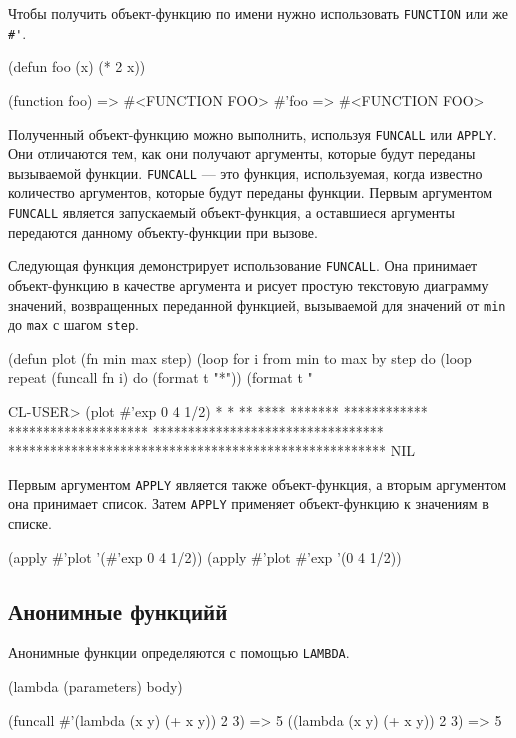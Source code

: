 Чтобы получить объект-функцию по имени нужно использовать \lstinline{FUNCTION} или же \lstinline{#'}.
\begin{cllst}{}{}
(defun foo (x) (* 2 x))

(function foo) => #<FUNCTION FOO>
#'foo          => #<FUNCTION FOO>
\end{cllst}

Полученный объект-функцию можно выполнить, используя \lstinline{FUNCALL} или \lstinline{APPLY}. Они отличаются тем, как они получают аргументы, которые будут переданы вызываемой функции. \lstinline{FUNCALL} — это функция, используемая, когда известно количество аргументов, которые будут переданы функции. Первым аргументом \lstinline{FUNCALL} является запускаемый объект-функция, а оставшиеся аргументы передаются данному объекту-функции при вызове.

Следующая функция демонстрирует использование \lstinline{FUNCALL}. Она принимает объект-функцию в качестве аргумента и рисует простую текстовую диаграмму значений, возвращенных переданной функцией, вызываемой для значений от \lstinline{min} до \lstinline{max} с шагом \lstinline{step}.
\begin{cllst}{}{}
(defun plot (fn min max step)
  (loop for i from min to max by step do
        (loop repeat (funcall fn i) do (format t "*"))
        (format t "~%

CL-USER> (plot #'exp 0 4 1/2)
*
*
**
****
*******
************
********************
*********************************
******************************************************
NIL
\end{cllst}

Первым аргументом \lstinline{APPLY} является также объект-функция, а вторым аргументом она принимает список. Затем \lstinline{APPLY} применяет объект-функцию к значениям в списке.
\begin{cllst}{}{}
(apply #'plot '(#'exp 0 4 1/2))
(apply #'plot #'exp '(0 4 1/2))
\end{cllst}

\subsection{Анонимные функцийй}
Анонимные функции определяются с помощью \lstinline{LAMBDA}.
\begin{cllst}{}{}
(lambda (parameters) body)

(funcall #'(lambda (x y) (+ x y)) 2 3) => 5
((lambda (x y) (+ x y)) 2 3)           => 5
\end{cllst}
